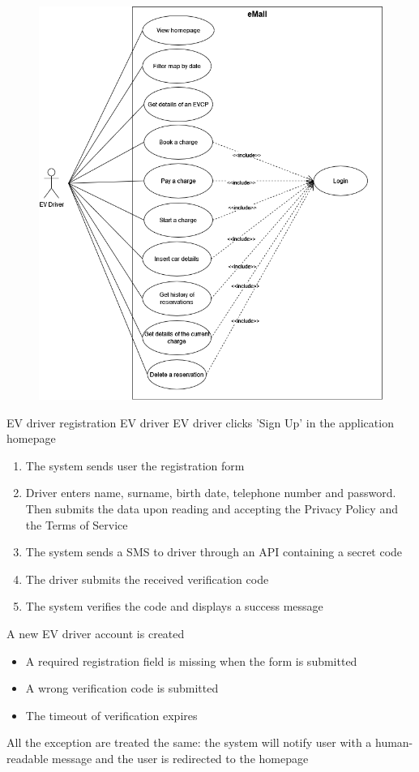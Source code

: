 \begin{figure}[H]
    \centering
    \includegraphics[scale=0.6]{src/use_case_diagram/driver.png}
\end{figure}

\usecase
{EV driver registration}
{EV driver}
{EV driver clicks 'Sign Up' in the application homepage}
{
    \begin{enumerate}
        \item The system sends user the registration form
        \item Driver enters name, surname, birth date, telephone number and password. Then submits the data upon reading and accepting the Privacy Policy and the Terms of Service
        \item The system sends a SMS to driver through an API containing a secret code
        \item The driver submits the received verification code
        \item The system verifies the code and displays a success message
    \end{enumerate}
}
{A new EV driver account is created}
{
    \begin{itemize}
        \item A required registration field is missing when the form is submitted
        \item A wrong verification code is submitted
        \item The timeout of verification expires
    \end{itemize}
}
{
    All the exception are treated the same: the system will notify user with a human-readable message and the user is redirected to the homepage
}

